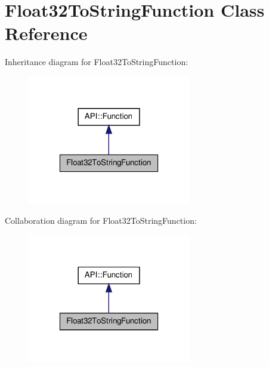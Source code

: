 \hypertarget{class_float32_to_string_function}{\section{Float32\-To\-String\-Function Class Reference}
\label{class_float32_to_string_function}
}


Inheritance diagram for Float32\-To\-String\-Function\-:\nopagebreak
\begin{figure}[H]
\begin{center}
\leavevmode
\includegraphics[width=202pt]{class_float32_to_string_function__inherit__graph}
\end{center}
\end{figure}


Collaboration diagram for Float32\-To\-String\-Function\-:\nopagebreak
\begin{figure}[H]
\begin{center}
\leavevmode
\includegraphics[width=202pt]{class_float32_to_string_function__coll__graph}
\end{center}
\end{figure}

